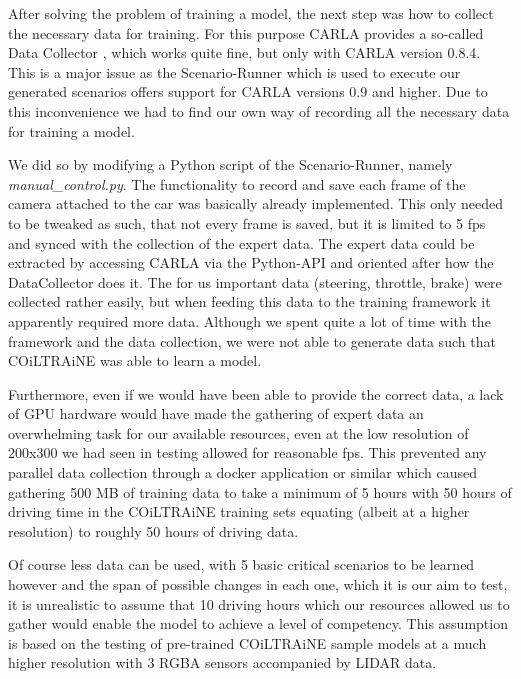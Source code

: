 \documentclass[conference, a4paper, 11pt]{IEEEtran}
\begin{document}
After solving the problem of training a model, the next step was how to collect the necessary data for training. For this purpose CARLA provides a so-called Data Collector \cite{CARLA:DataCollector}, which works quite fine, but only with CARLA version 0.8.4. This is a major issue as the Scenario-Runner which is used to execute our generated scenarios offers support for CARLA versions 0.9 and higher. Due to this inconvenience we had to find our own way of recording all the necessary data for training a model.

We did so by modifying a Python script of the Scenario-Runner, namely \textit{manual\_control.py}. The functionality to record and save each frame of the camera attached to the car was basically already implemented. This only needed to be tweaked as such, that not every frame is saved, but it is limited to 5 fps and synced with the collection of the expert data. The expert data could be extracted by accessing CARLA via the Python-API and oriented after how the DataCollector does it. The for us important data (steering, throttle, brake) were collected rather easily, but when feeding this data to the training framework it apparently required more data.
Although we spent quite a lot of time with the framework and the data collection, we were not able to generate data such that COiLTRAiNE was able to learn a model.

Furthermore, even if we would have been able to provide the correct data, a lack of GPU hardware would have made the gathering of expert data an overwhelming task for our available resources, even at the low resolution of 200x300 we had seen in testing allowed for reasonable fps. This prevented any parallel data collection through a docker application or similar which caused gathering 500 MB of training data to take a minimum of 5 hours with 50 hours of driving time in the COiLTRAiNE training sets equating (albeit at a higher resolution) to roughly 50 hours of driving data.

Of course less data can be used, with 5 basic critical scenarios to be learned however and the span of possible changes in each one, which it is our aim to test, it is unrealistic to assume that 10 driving hours which our resources allowed us to gather would enable the model to achieve a level of competency. This assumption is based on the testing of pre-trained COiLTRAiNE sample models at a much higher resolution with 3 RGBA sensors accompanied by LIDAR data.
\end{document}
